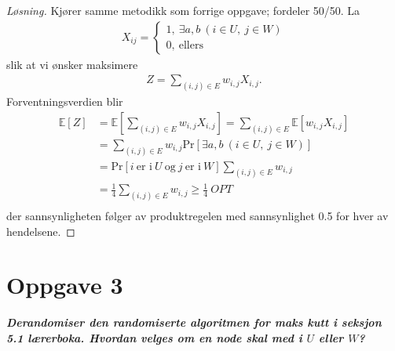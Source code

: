 \documentclass[12pt]{article}
\newenvironment{solution}{\begin{proof}[Løsning]}{\end{proof}}
\begin{document}
\begin{solution}
Kjører samme metodikk som forrige oppgave; fordeler 50/50.
La
\begin{align}
X_{ij} = \left\{
\begin{matrix}
1, ~\exists a,b ~(i \in U, ~ j \in W) \\ 0, ~ \textrm{ellers}
\end{matrix}
\right.
\end{align}
slik at vi ønsker maksimere
\begin{align}
Z = \sum_{(i, j) \in E} w_{i,j} X_{i, j}.
\end{align}
Forventningsverdien blir
\begin{align}
\mathbb{E}[Z] &= \mathbb{E} \left[ \sum_{(i, j) \in E} w_{i,j} X_{i, j} \right] = \sum_{(i, j) \in E} \mathbb{E} \left[ w_{i,j} X_{i, j} \right] \\
&= \sum_{(i, j) \in E} w_{i, j} \mathrm{Pr} \left[ \exists a,b ~(i \in U, ~ j \in W) \right] \\
&= \mathrm{Pr} \left[ i~\textrm{er i}~U ~\textrm{og} ~j~\textrm{er i}~W \right] \sum_{(i, j) \in E} w_{i, j}\\
&= \frac{1}{4} \sum_{(i, j) \in E} w_{i, j} \geq \frac{1}{4}~OPT\\
\end{align}
der sannsynligheten følger av produktregelen med sannsynlighet 0.5 for hver av hendelsene.
\end{solution}

\section{Oppgave 3}
\it{\textbf{Derandomiser den randomiserte algoritmen for maks kutt i seksjon 5.1 lærerboka. Hvordan velges om en node skal med i $U$ eller $W$?}}
\end{document}
